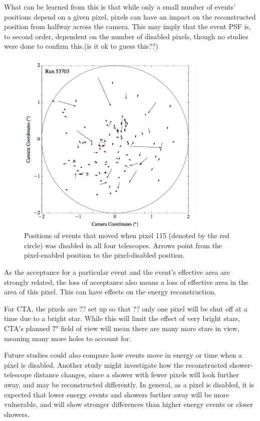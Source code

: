     What can be learned from this is that while only a small number of events' positions depend on a given pixel, pixels can have an impact on the reconstructed position from halfway across the camera.
    This may imply that the event PSF is, to second order, dependent on the number of disabled pixels, though no studies were done to confirm this.(is it ok to guess this??)


    \begin{figure}[ht]
      \centering
      \includegraphics[width=0.8\textwidth]{images/disabled_pixel/moving_events}
      \caption[Event Movement]{
        Positions of events that moved when pixel 115 (denoted by the red circle) was disabled in all four telescopes.  
        Arrows point from the pixel-enabled position to the pixel-disabled position.
      }
      \label{fig:dpix_move}
    \end{figure}

    As the acceptance for a particular event and the event's effective area are strongly related, the loss of acceptance also means a loss of effective area in the area of this pixel.
    This can have effects on the energy reconstruction.

    For CTA, the pixels are ?? set up so that ?? only one pixel will be shut off at a time due to a bright star.
    While this will limit the effect of very bright stars, CTA's planned $\ang{7}$ field of view will mean there are many more stars in view, meaning many more holes to account for.

    Future studies could also compare how events move in energy or time when a pixel is disabled.
    Another study might investigate how the reconstructed shower-telescope distance changes, since a shower with fewer pixels will look further away, and may be reconstructed differently.
    In general, as a pixel is disabled, it is expected that lower energy events and showers further away will be more vulnerable, and will show stronger differences than higher energy events or closer showers.


